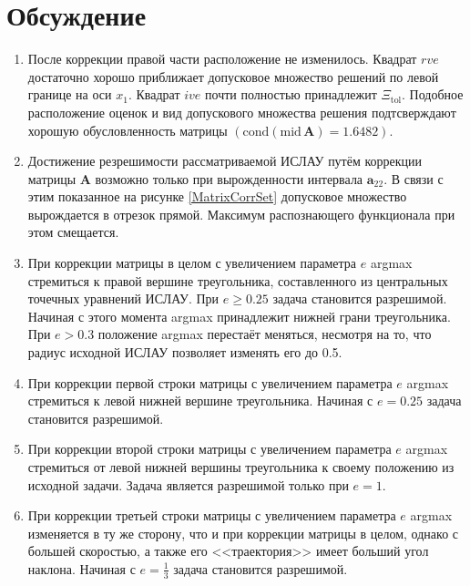 \section{Обсуждение}
\begin{enumerate}
    \item После коррекции правой части расположение  не изменилось. Квадрат $rve$ достаточно хорошо приближает допусковое множество решений по левой границе на оси $x_1$. Квадрат $ive$ почти полностью принадлежит $\Xi_{\mathrm{tol}}$. Подобное расположение оценок и вид допускового множества решения подтсверждают хорошую обусловленность матрицы $(\mathrm{cond}(\mathrm{mid}\,\mathbf{A})=1.6482)$.
    \item Достижение резрешимости рассматриваемой ИСЛАУ путём коррекции матрицы $\mathbf{A}$ возможно только при вырожденности интервала $\mathbf{a}_{22}$. В связи с этим показанное на рисунке \eqref{MatrixCorrSet} допусковое множество вырождается в отрезок прямой. Максимум распознающего функционала при этом смещается.
    \item При коррекции матрицы в целом с увеличением параметра $e$ argmax стремиться к правой вершине треугольника, составленного из центральных точечных уравнений ИСЛАУ. При $e\geq0.25$ задача становится разрешимой. Начиная с этого момента argmax принадлежит нижней грани треугольника. При $e>0.3$ положение argmax перестаёт меняться, несмотря на то, что радиус исходной ИСЛАУ позволяет изменять его до 0.5.
    \item При коррекции первой строки матрицы с увеличением параметра $e$ argmax стремиться к левой нижней вершине треугольника. Начиная с $e=0.25$ задача становится разрешимой.
    \item При коррекции второй строки матрицы с увеличением параметра $e$ argmax стремиться от левой нижней вершины треугольника к своему положению из исходной задачи. Задача является разрешимой только при $e=1$.
    \item При коррекции третьей строки матрицы с увеличением параметра $e$ argmax изменяется в ту же сторону, что и при коррекции матрицы в целом, однако с большей скоростью, а также его <<траектория>> имеет больший угол наклона. Начиная с $e=\frac{1}{3}$ задача становится разрешимой.
\end{enumerate}